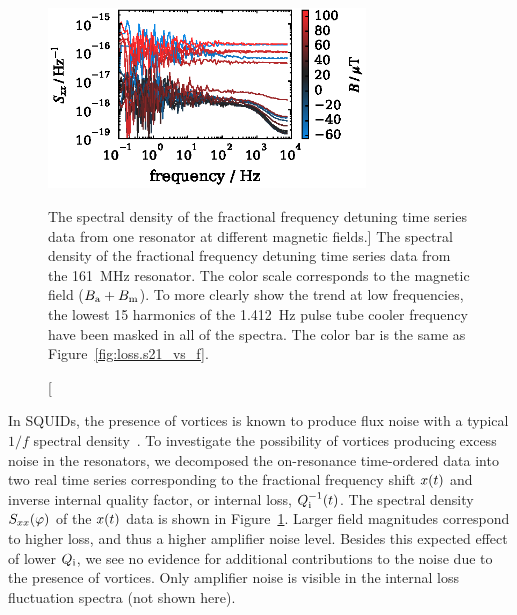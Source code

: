 \begin{figure}[tb]
\centering
\includegraphics[width=0.75\textwidth]{loss/Sxx_vs_f_colorbar_B.eps}
\caption
[The spectral density of the fractional frequency detuning time series data from one resonator at different magnetic fields.]
{The spectral density of the fractional frequency detuning time series data from the \SI{161}{MHz} resonator.
The color scale corresponds to the magnetic field ($B_{\mathrm{a}} + B_{\mathrm{m}}$).
To more clearly show the trend at low frequencies, the lowest 15 harmonics of the \SI{1.412}{Hz} pulse tube cooler frequency have been masked in all of the spectra.
The color bar is the same as Figure~\ref{fig:loss.s21_vs_f}.
}
\label{fig:loss.Sxx_vs_f}
\end{figure}

In SQUIDs, the presence of vortices is known to produce flux noise with a typical $1 / f$ spectral density~\autocite{Dantsker1997APL}.
To investigate the possibility of vortices producing excess noise in the resonators, we decomposed the on-resonance time-ordered data into two real time series corresponding to the fractional frequency shift $x(t)$ and inverse internal quality factor, or internal loss, $Q_{\mathrm{i}}^{-1}(t)$.
The spectral density $S_{xx}(\varphi)$ of the $x(t)$ data is shown in Figure~\ref{fig:loss.Sxx_vs_f}.
Larger field magnitudes correspond to higher loss, and thus a higher amplifier noise level.
Besides this expected effect of lower $Q_{\mathrm{i}}$, we see no evidence for additional contributions to the noise due to the presence of vortices.
Only amplifier noise is visible in the internal loss fluctuation spectra (not shown here).

